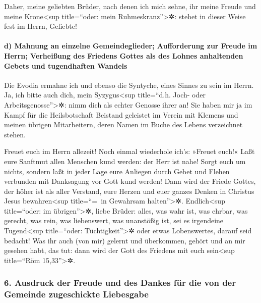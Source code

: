  Daher, meine geliebten Brüder, nach denen ich mich sehne,
ihr meine Freude und meine Krone\textless sup title=``oder: mein
Ruhmeskranz''\textgreater✲: stehet in dieser Weise fest im Herrn,
Geliebte!

\hypertarget{d-mahnung-an-einzelne-gemeindeglieder-aufforderung-zur-freude-im-herrn-verheiuxdfung-des-friedens-gottes-als-des-lohnes-anhaltenden-gebets-und-tugendhaften-wandels}{%
\paragraph{d) Mahnung an einzelne Gemeindeglieder; Aufforderung zur
Freude im Herrn; Verheißung des Friedens Gottes als des Lohnes
anhaltenden Gebets und tugendhaften
Wandels}\label{d-mahnung-an-einzelne-gemeindeglieder-aufforderung-zur-freude-im-herrn-verheiuxdfung-des-friedens-gottes-als-des-lohnes-anhaltenden-gebets-und-tugendhaften-wandels}}

 Die Evodia ermahne ich und ebenso die Syntyche, eines
Sinnes zu sein im Herrn.  Ja, ich bitte auch dich, mein
Syzygus\textless sup title=``d.h. Joch- oder
Arbeitsgenosse''\textgreater✲: nimm dich als echter Genosse ihrer an!
Sie haben mir ja im Kampf für die Heilsbotschaft Beistand geleistet im
Verein mit Klemens und meinen übrigen Mitarbeitern, deren Namen im Buche
des Lebens verzeichnet stehen.

 Freuet euch im Herrn allezeit! Noch einmal wiederhole
ich's: »Freuet euch!«  Laßt eure Sanftmut allen Menschen
kund werden: der Herr ist nahe!  Sorgt euch um nichts,
sondern laßt in jeder Lage eure Anliegen durch Gebet und Flehen
verbunden mit Danksagung vor Gott kund werden!  Dann wird
der Friede Gottes, der höher ist als aller Verstand, eure Herzen und
euer ganzes Denken in Christus Jesus bewahren\textless sup title=``=~in
Gewahrsam halten''\textgreater✲.  Endlich\textless sup
title=``oder: im übrigen''\textgreater✲, liebe Brüder: alles, was wahr
ist, was ehrbar, was gerecht, was rein, was liebenswert, was unanstößig
ist, sei es irgendeine Tugend\textless sup title=``oder:
Tüchtigkeit''\textgreater✲ oder etwas Lobenswertes, darauf seid bedacht!
 Was ihr auch (von mir) gelernt und überkommen, gehört und
an mir gesehen habt, das tut: dann wird der Gott des Friedens mit euch
sein\textless sup title=``Röm 15,33''\textgreater✲.

\hypertarget{ausdruck-der-freude-und-des-dankes-fuxfcr-die-von-der-gemeinde-zugeschickte-liebesgabe}{%
\subsubsection{6. Ausdruck der Freude und des Dankes für die von der
Gemeinde zugeschickte
Liebesgabe}\label{ausdruck-der-freude-und-des-dankes-fuxfcr-die-von-der-gemeinde-zugeschickte-liebesgabe}}

